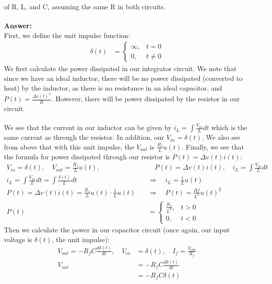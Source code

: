 \documentclass[12pt, a4paper]{article}
\begin{document}
\begin{enumerate}[(a)]
of R, L, and C, assuming the same R in both circuits. \\ \\
\textbf{Answer: } \\
First, we define the unit impulse function:
\begin{align*}
    \delta(t) &= \begin{cases}
    	\infty, & t = 0 \\
      0, & t \neq 0
    \end{cases}
\end{align*}
We first calculate the power dissipated in our integrator circuit. We note that since we have an ideal inductor, there will be no power dissipated (converted to heat) by the inductor, as there is no resistance in an ideal capacitor, and $P(t) = \frac{\Delta v(t)^2}{R}$. However, there will be power dissipated by the resistor in our circuit. \\ \\
We see that the current in our inductor can be given by $i_L = \int \frac{V_{in}}{L} dt$ which is the same current as through the resistor. In addition, our $V_{in} = \delta(t)$. We also see from above that with this unit impulse, the $V_{out}$ is $\frac{R_f}{L}u(t)$. Finally, we see that the formula for power dissipated through our resistor is $P(t) = \Delta v(t) i(t)$:
\begin{align*}
V_{in} = \delta(t), \quad V_{out} = \frac{R_f}{L}u(t), &\quad P(t) = \Delta v(t) i(t), \quad i_L = \int \frac{V_{in}}{L} dt \\
i_L = \int \frac{V_{in}}{L} dt =\int \frac{\delta(t)}{L} dt \quad &\Rightarrow \quad i_L = \frac{1}{L} u(t)  \\
 P(t) = \Delta v(t) i(t) = \frac{R_f}{L}u(t) \cdot \frac{1}{L} u(t) \quad &\Rightarrow \quad P(t) = \frac{Rf}{L^2} u(t)^2 \\
    P(t) &= \begin{cases}
      \frac{R_f}{L^2}, & t > 0 \\
      0, & t < 0
    \end{cases}
\end{align*}
Then we calculate the power in our capacitor circuit (once again, our input voltage is $\delta(t)$, the unit impulse):
\begin{align*}
V_{out} = -R_f C \frac{d \delta(t)}{dt}, \quad V_{in} &= \delta(t), \quad I_f = \frac{V_{out}}{R_f} \\
V_{out} &= -R_f C \frac{d \delta(t)}{dt} \\
&=  -R_f C \delta(t) \\

\end{align*}
\end{enumerate}
\end{document}
